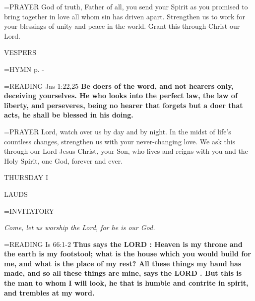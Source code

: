 \hangindent=\parindent \small{PRAYER  God of truth, Father of all, you send your Spirit as you promised to bring together in love all whom sin has driven apart.  Strengthen us to work for your blessings of unity and peace in the world. Grant this through Christ our Lord.}

\begin{flushleft}\normalsize VESPERS\\\end{flushleft}

\hangindent=\parindent \small{\uppercase{HYMN} p.  \pageref{ordinaryTime:fourthHymn} - \pageref{ordinaryTime:sixthHymn} \\}

\hangindent=\parindent \small{READING} Jas 1:22,25 \textbf{Be doers of the word, and not hearers only, deceiving yourselves. He who looks into the perfect law, the law of liberty, and perseveres, being no hearer that forgets but a doer that acts, he shall be blessed in his doing.\\}

\hangindent=\parindent \small{PRAYER  Lord, watch over us by day and by night. In the midst of life’s countless changes, strengthen us with your never-changing love.  We ask this through our Lord Jesus Christ, your Son, who lives and reigns with you and the Holy Spirit, one God, forever and ever.}

\begin{center}
\normalsize THURSDAY I
\end{center}

\begin{flushleft}\normalsize LAUDS\\\end{flushleft}

\hangindent=\parindent \small{INVITATORY}
\begin{center}
\textit{Come, let us worship the Lord, for he is our God.\\}
\end{center}

\hangindent=\parindent \small{READING} Is 66:1-2 \textbf{Thus says the LORD : Heaven is my throne and the earth is my footstool; what is the house which you would build for me, and what is the place of my rest? All these things my hand has made, and so all these things are mine, says the LORD . But this is the man to whom I will look, he that is humble and contrite in spirit, and trembles at my word.\\}

